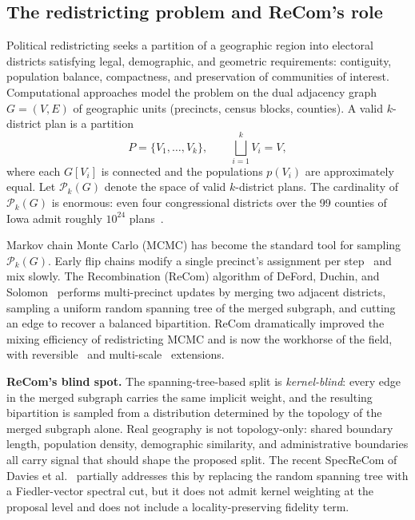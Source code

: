 \documentclass[11pt]{article}
\begin{document}
\subsection{The redistricting problem and ReCom's role}\label{sec:intro-problem}

Political redistricting seeks a partition of a geographic region into
electoral districts satisfying legal, demographic, and geometric
requirements: contiguity, population balance, compactness, and
preservation of communities of interest. Computational approaches model
the problem on the dual adjacency graph $G = (V,E)$ of geographic units
(precincts, census blocks, counties). A valid $k$-district plan is a
partition
\[
  P = \{V_1, \ldots, V_k\}, \qquad \bigsqcup_{i=1}^k V_i = V,
\]
where each $G[V_i]$ is connected and the populations $p(V_i)$ are
approximately equal. Let $\mathcal{P}_k(G)$ denote the space of valid
$k$-district plans. The cardinality of $\mathcal{P}_k(G)$ is enormous:
even four congressional districts over the 99 counties of Iowa admit
roughly $10^{24}$ plans~\cite{fifield2020essential}.

Markov chain Monte Carlo (MCMC) has become the standard tool for
sampling $\mathcal{P}_k(G)$. Early flip chains modify a single
precinct's assignment per step~\cite{fifield2020automated} and mix
slowly. The Recombination (ReCom) algorithm of DeFord, Duchin, and
Solomon~\cite{deford2021recombination} performs multi-precinct updates
by merging two adjacent districts, sampling a uniform random spanning
tree of the merged subgraph, and cutting an edge to recover a balanced
bipartition. ReCom dramatically improved the mixing efficiency of
redistricting MCMC and is now the workhorse of the field, with
reversible~\cite{cannon2022spanning} and multi-scale~\cite{autry2020multiscale}
extensions.

\textbf{ReCom's blind spot.} The spanning-tree-based split is
\emph{kernel-blind}: every edge in the merged subgraph carries the same
implicit weight, and the resulting bipartition is sampled from a
distribution determined by the topology of the merged subgraph alone.
Real geography is not topology-only: shared boundary length, population
density, demographic similarity, and administrative boundaries
all carry signal that should shape the proposed split. The recent
SpecReCom of Davies et al.~\cite{davies2025spectral} partially
addresses this by replacing the random spanning tree with a Fiedler-vector
spectral cut, but it does not admit kernel weighting at the
proposal level and does not include a locality-preserving fidelity term.
\end{document}
